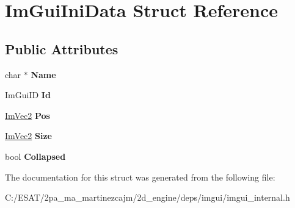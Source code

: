 \hypertarget{struct_im_gui_ini_data}{}\section{Im\+Gui\+Ini\+Data Struct Reference}
\label{struct_im_gui_ini_data}
\subsection*{Public Attributes}
\begin{DoxyCompactItemize}
\item 
\mbox{\label{struct_im_gui_ini_data_aef4db96cc7332d492bba873028a00f66}} 
char $\ast$ {\bfseries Name}
\item 
\mbox{\label{struct_im_gui_ini_data_a8c3cd42549a5f432199d1a66e0133d80}} 
Im\+Gui\+ID {\bfseries Id}
\item 
\mbox{\label{struct_im_gui_ini_data_a8598c0d937901fc22f808f11f9aa6bac}} 
\hyperlink{struct_im_vec2}{Im\+Vec2} {\bfseries Pos}
\item 
\mbox{\label{struct_im_gui_ini_data_af3d56b3e89c45d07d7927ab95dbd86fa}} 
\hyperlink{struct_im_vec2}{Im\+Vec2} {\bfseries Size}
\item 
\mbox{\label{struct_im_gui_ini_data_a299660ea0cab78a8cbefa02314c8cf47}} 
bool {\bfseries Collapsed}
\end{DoxyCompactItemize}


The documentation for this struct was generated from the following file\+:\begin{DoxyCompactItemize}
\item 
C\+:/\+E\+S\+A\+T/2pa\+\_\+ma\+\_\+martinezcajm/2d\+\_\+engine/deps/imgui/imgui\+\_\+internal.\+h\end{DoxyCompactItemize}
